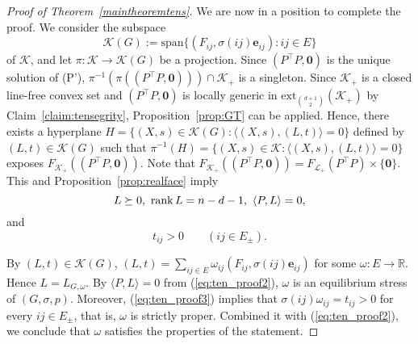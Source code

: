 \documentclass[11pt]{article}
\theoremstyle{definition}
\begin{document}
\begin{proof}[Proof of Theorem~\ref{maintheoremtens}]
    We are now in a position to complete the proof.
    We consider the subspace
    \[
    \mathcal{K}(G):=\text{span} \{ (F_{ij},\sigma(ij)\bm{e}_{ij}) :  ij\in E\}
    \]
    of $\mathcal{K}$,  and let $\pi: \mathcal{K} \rightarrow \mathcal{K}(G)$ be a projection.
        Since $(P^\top P,\bm{0})$ is the unique solution of (P'), 
        $\pi^{-1}\left(\pi( (P^\top P,\bm{0}) )\right) \cap \mathcal{K}_+$ is a singleton.
        Since $\mathcal{K}_+$ is a closed line-free convex set and 
        $(P^\top P,\bm{0})$ is locally generic in $\text{ext}_{\binom{d+1}{2}}(\mathcal{K}_+)$ by Claim~\ref{claim:tensegrity}, 
        Proposition~\ref{prop:GT} can be applied. 
        Hence,    there exists a hyperplane $H=\{(X,s)\in \mathcal{K}(G): \langle (X,s), (L,t)\rangle=0\}$ defined by $(L,t)\in \mathcal{K}(G)$ 
        such that $\pi^{-1}(H)=\{(X,s)\in \mathcal{K}: \langle (X,s), (L,t)\rangle=0\}$ exposes $F_{\mathcal{K}_+}((P^{\top}P, {\bm 0}))$.
        Note that $F_{\mathcal{K}_+}((P^{\top}P, {\bm 0}))=F_{\mathcal{L}_+}(P^{\top}P)\times \{\bm 0\}$.
        This and Proposition~\ref{prop:realface} imply  
        \begin{equation} \label{eq:ten_proof2}
        L\succeq 0,\ \rank L=n-d-1,\  \langle P, L\rangle=0,
        \end{equation}
        and  
        \begin{equation}\label{eq:ten_proof3}
        t_{ij} > 0 \qquad (ij\in E_\pm).
        \end{equation}
        
        By $(L,t)\in \mathcal{K}(G)$, $(L,t)=\sum_{ij\in E} \omega_{ij} (F_{ij}, \sigma(ij){\bm e}_{ij})$ for some $\omega:E\rightarrow \mathbb{R}$.
        Hence $L=L_{G,\omega}$. By $\langle P, L\rangle=0$ from (\ref{eq:ten_proof2}), $\omega$ is an equilibrium stress of $(G,\sigma,p)$.
        Moreover, (\ref{eq:ten_proof3}) implies that $\sigma(ij)\omega_{ij}=t_{ij}>0$ for every $ij\in E_\pm$, that is, $\omega$ is strictly proper.
        Combined it with (\ref{eq:ten_proof2}), we conclude that $\omega$ satisfies the properties of the statement.
%        
%        
%        
%        
%         
%
    \end{proof}
\end{document}
